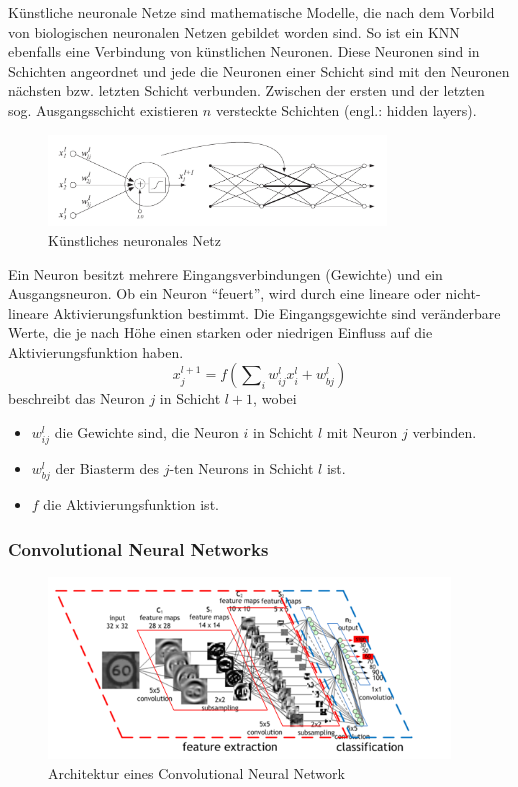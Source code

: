 \noindent
Künstliche neuronale Netze sind mathematische Modelle, die nach dem Vorbild von biologischen neuronalen Netzen gebildet worden sind. So ist ein KNN ebenfalls eine Verbindung von künstlichen Neuronen. Diese Neuronen sind in Schichten angeordnet und jede die Neuronen einer Schicht sind mit den Neuronen nächsten bzw. letzten Schicht verbunden. Zwischen der ersten und der letzten sog. Ausgangsschicht existieren $n$ versteckte Schichten (engl.: hidden layers). 

\begin{figure}[ht]
  \centering
  \includegraphics[width=0.8\textwidth]{pics/neural-net.PNG}
  \caption[Künstliches neuronales Netz]{Künstliches neuronales Netz\cite{ref:verrelst}}
  \label{fig:ann}
\end{figure}
\noindent
Ein Neuron besitzt mehrere Eingangsverbindungen (Gewichte) und ein Ausgangsneuron. Ob ein Neuron "`feuert"', wird durch eine lineare oder nicht-lineare Aktivierungsfunktion bestimmt. Die Eingangsgewichte sind veränderbare Werte, die je nach Höhe einen starken oder niedrigen Einfluss auf die Aktivierungsfunktion haben.
\begin{equation}\label{equ:neuron}
x^{l+1}_{j}=f(\sum\nolimits_i w^l_{ij}x^l_i + w^l_{bj})
\end{equation}
beschreibt das Neuron $j$ in Schicht $l+1$, wobei
\begin{itemize}
	\item $w^l_{ij}$ die Gewichte sind, die Neuron $i$ in Schicht $l$ mit Neuron $j$ verbinden.
	\item $w^l_{bj}$ der Biasterm des $j$-ten Neurons in Schicht $l$ ist.
	\item $f$ die Aktivierungsfunktion ist.\cite{ref:verrelst}
\end{itemize} 

\subsubsection{Convolutional Neural Networks}\label{sec:sub:sub:cnn}
\begin{figure}[ht]
  \centering
  \includegraphics[width=0.95\textwidth]{pics/cnn.png}
  \caption[CNN]{Architektur eines Convolutional Neural Network\cite{ref:cnn-architecture}}
  \label{fig:cnn-architecture}
\end{figure}

